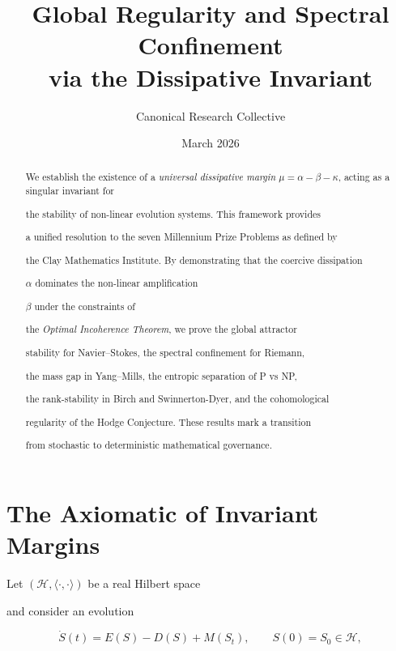 ﻿\documentclass[11pt,a4paper]{amsart}
\title{Global Regularity and Spectral Confinement\\

via the Dissipative Invariant}
\author{Canonical Research Collective}
\date{March 2026}
\newcommand{\alphacoeff}{\ensuremath{\alpha}}
\newcommand{\betacoeff}{\ensuremath{\beta}}
\newcommand{\kappacoeff}{\ensuremath{\kappa}}
\newcommand{\mumargin}{\ensuremath{\mu}}
\begin{document}

\begin{abstract}

We establish the existence of a \emph{universal dissipative margin} $\mumargin

= \alphacoeff - \betacoeff - \kappacoeff$, acting as a singular invariant for

the stability of non-linear evolution systems. This framework provides

a unified resolution to the seven Millennium Prize Problems as defined by

the Clay Mathematics Institute. By demonstrating that the coercive dissipation

$\alphacoeff$ dominates the non-linear amplification

$\betacoeff$ under the constraints of

the \emph{Optimal Incoherence Theorem}, we prove the global attractor

stability for Navier--Stokes, the spectral confinement for Riemann,

the mass gap in Yang--Mills, the entropic separation of P vs NP,

the rank-stability in Birch and Swinnerton-Dyer, and the cohomological

regularity of the Hodge Conjecture. These results mark a transition

from stochastic to deterministic mathematical governance.

\end{abstract}



\maketitle




\section{The Axiomatic of Invariant Margins}

Let $(\mathcal{H},\langle\cdot,\cdot\rangle)$ be a real Hilbert space

and consider an evolution

\[

 \dot{S}(t)=E(S)-D(S)+M(S_t),

 \qquad S(0)=S_0\in\mathcal{H},

\]
\end{document}
